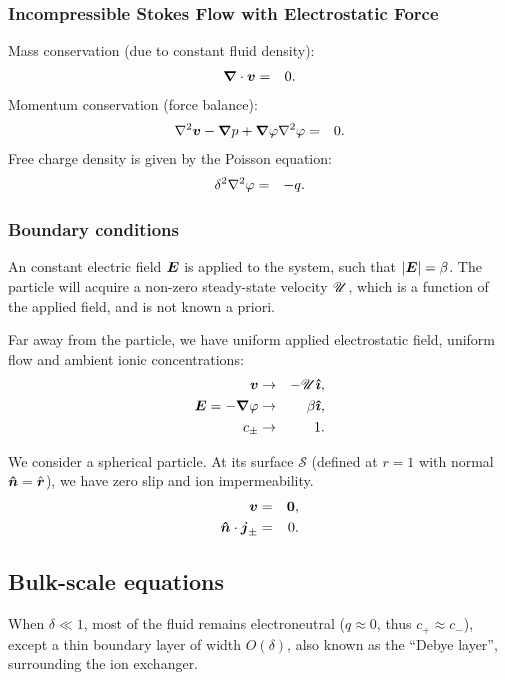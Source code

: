 \subsubsection{Incompressible Stokes Flow with Electrostatic Force}
Mass conservation (due to constant fluid density):
\begin{eqnarray}
\boldsymbol{\nabla} \cdot \boldsymbol{v} &=& 0.
\end{eqnarray}
Momentum conservation (force balance):
\begin{eqnarray}
\nabla^2 \boldsymbol{v} - \boldsymbol{\nabla} p + \boldsymbol{\nabla} \varphi \nabla^2 \varphi &=& 0.
\end{eqnarray}
Free charge density is given by the Poisson equation:
\begin{eqnarray}
\delta^2 \nabla^2 \varphi &=& -q.
\end{eqnarray}

\subsubsection{Boundary conditions}
An constant electric field $\boldsymbol{E}$ is applied to the system, such that $|\boldsymbol{E}| = \beta$.
The particle will acquire a non-zero steady-state velocity $\mathscr{U}$, which is
a function of the applied field, and is not known a priori.

Far away from the particle, we have uniform applied electrostatic field, uniform flow 
and ambient ionic concentrations:
\begin{eqnarray}
\boldsymbol{v} &\rightarrow& -\mathscr{U} \boldsymbol{\hat{\imath}}, \\
\boldsymbol{E} = -\boldsymbol{\nabla} \varphi &\rightarrow& \beta\boldsymbol{\hat{\imath}}, \\
c_\pm &\rightarrow& 1.
\end{eqnarray}

We consider a spherical particle. 
At its surface $\mathcal{S}$ (defined at $r=1$ with normal $\boldsymbol{\hat{n}} = \hat{\boldsymbol{r}}$), 
we have zero slip and ion impermeability.
\begin{eqnarray}
\boldsymbol{v} & = & \boldsymbol{0}, \\
\boldsymbol{\hat{n}} \cdot \boldsymbol{j}_\pm & = & 0.
\end{eqnarray}

\subsection{Bulk-scale equations}
When $\delta \ll 1$, 
most of the fluid remains electroneutral ($q \approx 0$, thus $c_+ \approx c_-$), 
except a thin boundary layer of width $O(\delta)$, 
also known as the ``Debye layer'', surrounding the ion exchanger. 


